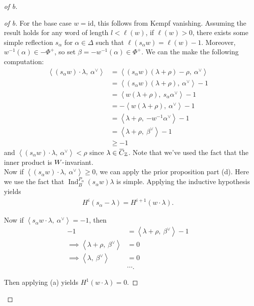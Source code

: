 \begin{proof}[of b]

\begin{proof}[of b]

For the base case \(w=\text{id}\), this follows from Kempf vanishing.
Assuming the result holds for any word of length \(l<\ell(w)\), if
\(\ell(w) > 0\), there exists some simple reflection \(s_\alpha\) for
\(\alpha\in\Delta\) such that \(\ell(s_\alpha w) = \ell(w) - 1\).
Moreover, \(w^{-1}(\alpha) \in -\Phi^+\), so set
\(\beta = -w^{-1}(\alpha) \in \Phi^+\). We can the make the following
computation:
\begin{align*}   {\left\langle {(s_\alpha w) \cdot \lambda},~{\alpha^\vee} \right\rangle} &= {\left\langle {(s_\alpha w)(\lambda+\rho) - \rho},~{\alpha^\vee} \right\rangle}  \\ &= {\left\langle {(s_\alpha w)(\lambda+\rho)},~{\alpha^\vee} \right\rangle} - 1 \\ &= {\left\langle {w(\lambda+\rho)},~{s_\alpha \alpha^\vee} \right\rangle} - 1 \\ &= - {\left\langle {w(\lambda+\rho)},~{\alpha^\vee} \right\rangle} - 1  \\ &= {\left\langle {\lambda + \rho},~{-w^{-1}\alpha^\vee} \right\rangle} - 1 \\ &= {\left\langle {\lambda + \rho},~{\beta^\vee} \right\rangle} - 1 \\ &\geq -1 \end{align*}
and
\({\left\langle {(s_\alpha w)\cdot \lambda},~{ \alpha^\vee} \right\rangle} < \rho\)
since
\(\lambda\in \mkern 1.5mu\overline{\mkern-1.5muC\mkern-1.5mu}\mkern 1.5mu_{\mathbb{Z}}\).
Note that we've used the fact that the inner product is
\(W{\hbox{-}}\)invariant.\\

Now if
\({\left\langle {(s_\alpha w)\cdot \lambda},~{ \alpha^\vee} \right\rangle} \geq 0\),
we can apply the prior proposition part (d). Here we use the fact that
\(\operatorname{Ind}_B^{P_\alpha}(s_\alpha w)\lambda\) is simple.
Applying the inductive hypothesis yields
\begin{align*}   H^i(s_\alpha - \lambda) = H^{i+1}(w\cdot \lambda) .\end{align*}

Now if
\({\left\langle {s_\alpha w \cdot \lambda},~{\alpha^\vee} \right\rangle} = -1\),
then
\begin{align*}   -1 &= {\left\langle {\lambda + \rho},~{\beta^\vee} \right\rangle} - 1 \\ \implies {\left\langle {\lambda + \rho},~{\beta^\vee} \right\rangle} &= 0 \\ \implies {\left\langle {\lambda},~{\beta^\vee} \right\rangle} &= 0 \\ & \cdots .\end{align*}


Then applying (a) yields \(H^1(w\cdot \lambda) = 0\).

\end{proof}

\end{proof}

